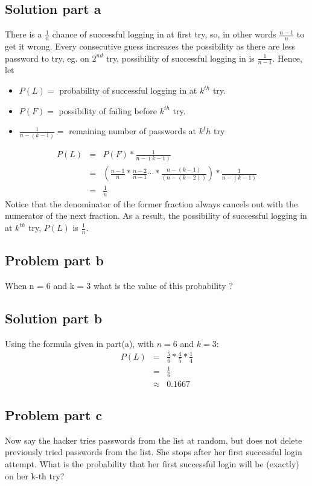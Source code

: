 \documentclass[12pt]{article}%
\begin{document}
\subsection*{Solution part a}
There is a $\frac{1}{n}$ chance of successful logging in at first try, so, in other words $\frac{n-1}{n}$ to get it wrong. Every consecutive guess increases the possibility as there are less password to try, eg. on $2^{nd}$ try, possibility of successful logging in is $\frac{1}{n-1}$. Hence, let 
\begin{itemize}
\item $P(L) =$ probability of successful logging in at $k^{th}$ try.  
\item $P(F) =$ possibility of failing before $k^{th}$ try.
\item $\frac{1}{n-(k-1)} =$ remaining number of passwords at $k^th$ try
\end{itemize}
\begin{eqnarray*}
P(L) & = & P(F) * \frac{1}{n-(k-1)} \\
     & = & (\frac{n-1}{n} * \frac{n-2}{n-1} \cdots * \frac{n-(k-1)}{(n-(k-2))}) * \frac{1}{n-(k-1)} \\
     & = & \frac{1}{n}
\end{eqnarray*}
Notice that the denominator of the former fraction always cancels out with the numerator of the next fraction. As a result, the possibility of successful logging in at $k^{th}$ try, $P(L)$ is $\frac{1}{n}$.
\subsection*{Problem part b}
When n = 6 and k = 3 what is the value of this probability ?
\subsection*{Solution part b}
Using the formula given in part(a), with $n = 6$ and $k = 3$:
\begin{eqnarray*}
P(L) & = & \frac{5}{6} * \frac{4}{5} * \frac{1}{4} \\
	 & = & \frac{1}{6} \\
	 & \approx & 0.1667
\end{eqnarray*}

\subsection*{Problem part c}
Now say the hacker tries passwords from the list at random, but does not delete previously tried passwords from the list. She stops after her first successful login attempt. What is the probability that her first successful login will be (exactly) on her k-th try?
\end{document}
